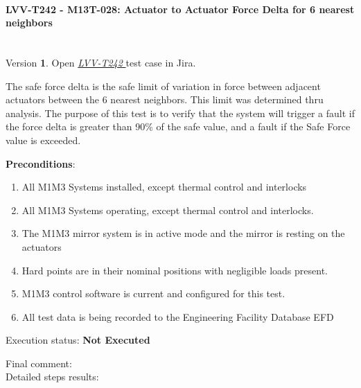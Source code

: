 \documentclass[SE,lsstdraft,STR,toc]{lsstdoc}
\providecommand{\tightlist}{
  \setlength{\itemsep}{0pt}\setlength{\parskip}{0pt}}
\begin{document}
\paragraph{ LVV-T242 - M13T-028: Actuator to Actuator Force Delta for 6 nearest neighbors }\mbox{}\\

Version \textbf{1}.
Open  \href{https://jira.lsstcorp.org/secure/Tests.jspa#/testCase/LVV-T242}{\textit{ LVV-T242 } }
test case in Jira.

The safe force delta is the safe limit of variation in force between
adjacent actuators between the 6 nearest neighbors. This limit was
determined thru analysis. The purpose of this test is to verify that the
system will trigger a fault if the force delta is greater than 90\% of
the safe value, and a fault if the Safe Force value is exceeded.

\textbf{ Preconditions}:\\
\begin{enumerate}
\tightlist
\item
  All M1M3 Systems installed, except thermal control and interlocks
\item
  All M1M3 Systems operating, except thermal control and interlocks.
\item
  The M1M3 mirror system is in active mode and the mirror is resting on
  the actuators
\item
  Hard points are in their nominal positions with negligible loads
  present.
\item
  M1M3 control software is current and configured for this test.
\item
  All test data is being recorded to the Engineering Facility Database
  EFD
\end{enumerate}

Execution status: {\bf Not Executed }

Final comment:\\


Detailed steps results:
\end{document}
